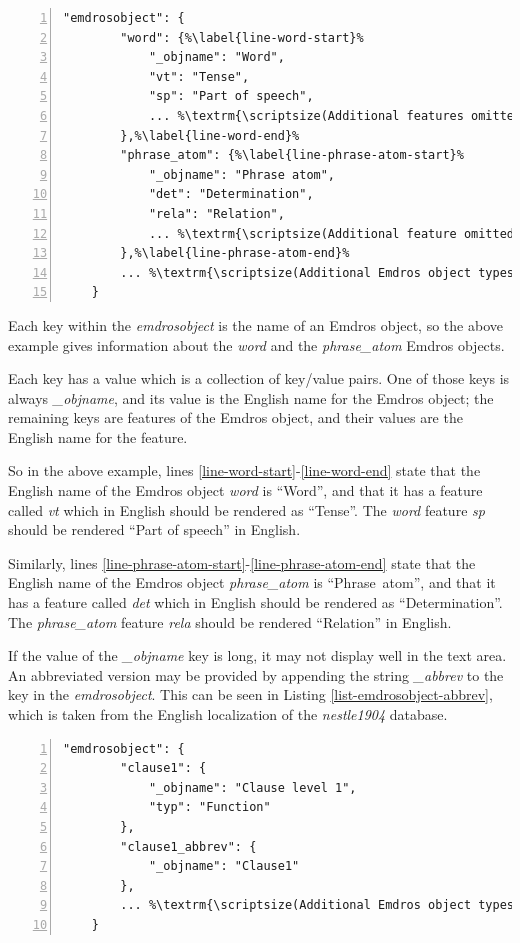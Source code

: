 \documentclass[11pt,oneside,a4paper]{memoir}
\begin{document}
\begin{lstlisting}[numbers=left,caption=A sample emdrosobject value,label=list-emdrosobject-sample]
    "emdrosobject": {
        "word": {%\label{line-word-start}%
            "_objname": "Word",
            "vt": "Tense",
            "sp": "Part of speech",
            ... %\textrm{\scriptsize(Additional features omitted)}%
        },%\label{line-word-end}%
        "phrase_atom": {%\label{line-phrase-atom-start}%
            "_objname": "Phrase atom",
            "det": "Determination",
            "rela": "Relation",
            ... %\textrm{\scriptsize(Additional feature omitted)}%
        },%\label{line-phrase-atom-end}%
        ... %\textrm{\scriptsize(Additional Emdros object types omitted)}%
    }
\end{lstlisting}


Each key within the \emph{emdrosobject} is the name of an Emdros object, so the above example gives
information about the \emph{word} and the \emph{phrase\_atom} Emdros objects.

Each key has a value which is a collection of key/value pairs. One of those keys is always
\emph{\_objname}, and its value is the English name for the Emdros object; the remaining keys are
features of the Emdros object, and their values are the English name for the feature.

So in the above example, lines \ref{line-word-start}-\ref{line-word-end} state that the English name
of the Emdros object \emph{word} is ``Word'', and that it has a feature called \emph{vt} which
in English should be rendered as ``Tense''. The \emph{word} feature \emph{sp} should be rendered
``Part of speech'' in English.

Similarly, lines \ref{line-phrase-atom-start}-\ref{line-phrase-atom-end} state that the English name
of the Emdros object \emph{phrase\_atom} is ``Phrase~atom'', and that it has a feature called
\emph{det} which in English should be rendered as ``Determination''. The \emph{phrase\_atom} feature
\emph{rela} should be rendered ``Relation'' in English.

If the value of the \emph{\_objname} key is long, it may not display well in the text area. An
abbreviated version may be provided by appending the string \emph{\_abbrev} to the key in the
\emph{emdrosobject}. This can be seen in Listing \ref{list-emdrosobject-abbrev}, which is taken from
the English localization of the \emph{nestle1904} database.

\begin{lstlisting}[numbers=left,caption=An abbreviated emdrosobject name,label=list-emdrosobject-abbrev]
    "emdrosobject": {
        "clause1": {
            "_objname": "Clause level 1",
            "typ": "Function"
        },
        "clause1_abbrev": {
            "_objname": "Clause1"
        },
        ... %\textrm{\scriptsize(Additional Emdros object types omitted)}%
    }
\end{lstlisting}
\end{document}
